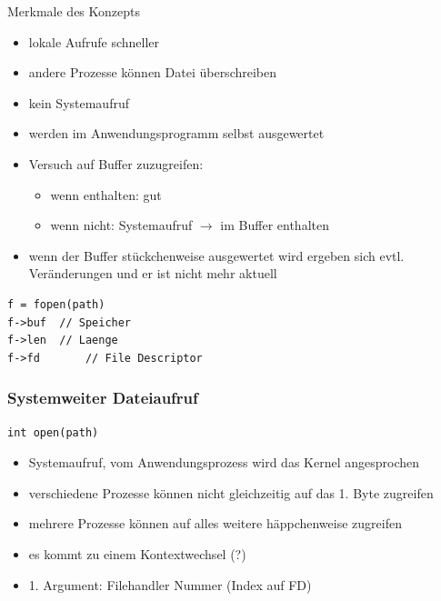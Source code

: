 		Merkmale des Konzepts
		\begin{itemize}
			\item lokale Aufrufe schneller
			\item andere Prozesse können Datei überschreiben
			\item kein Systemaufruf
			\item werden im Anwendungsprogramm selbst ausgewertet
			\item Versuch auf Buffer zuzugreifen:
				\begin{itemize}
					\item wenn enthalten: gut
					\item wenn nicht: Systemaufruf $\rightarrow$ im Buffer enthalten
				\end{itemize}
			\item wenn der Buffer stückchenweise ausgewertet wird ergeben sich evtl. Veränderungen und er ist nicht mehr aktuell
		\end{itemize}

		\begin{lstlisting}
f = fopen(path)
f->buf	// Speicher
f->len	// Laenge
f->fd		// File Descriptor
		\end{lstlisting}


	\subsubsection*{Systemweiter Dateiaufruf} %
	\label{ssub:systemweiter_dateiaufruf}

		\lstCcode[Systemaufruf]
		\begin{lstlisting}
int open(path)
		\end{lstlisting}

		\begin{itemize}
			\item Systemaufruf, vom Anwendungsprozess wird das Kernel angesprochen
			\item verschiedene Prozesse können nicht gleichzeitig auf das 1. Byte zugreifen
			\item mehrere Prozesse können auf alles weitere häppchenweise zugreifen
			\item es kommt zu einem Kontextwechsel (?)
			\item 1. Argument: Filehandler Nummer (Index auf FD)
		\end{itemize}
	
